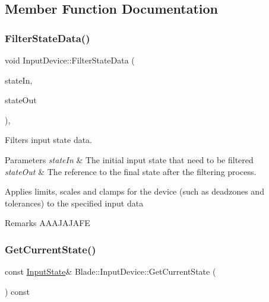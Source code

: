 \subsection{Member Function Documentation}
\mbox{\label{class_blade_1_1_input_device_ad9d8a25471322063e459f7b13f328d20}} 
\subsubsection{\texorpdfstring{Filter\+State\+Data()}{FilterStateData()}}
{\footnotesize\ttfamily void Input\+Device\+::\+Filter\+State\+Data (\begin{DoxyParamCaption}\item[{const \hyperlink{struct_blade_1_1_input_state}{Input\+State} \&}]{state\+In,  }\item[{\hyperlink{struct_blade_1_1_input_state}{Input\+State} \&}]{state\+Out }\end{DoxyParamCaption})\hspace{0.3cm}{\ttfamily [static]}, {\ttfamily [protected]}}



Filters input state data. 


\begin{DoxyParams}{Parameters}
{\em state\+In} & The initial input state that need to be filtered \\
\hline
{\em state\+Out} & The reference to the final state after the filtering process.\\
\hline
\end{DoxyParams}
Applies limits, scales and clamps for the device (such as deadzones and tolerances) to the specified input data \begin{DoxyRemark}{Remarks}
A\+A\+A\+J\+A\+J\+A\+FE 
\end{DoxyRemark}
\mbox{\label{class_blade_1_1_input_device_a71a14408ab206c4d983012b06b921d37}} 
\subsubsection{\texorpdfstring{Get\+Current\+State()}{GetCurrentState()}}
{\footnotesize\ttfamily const \hyperlink{struct_blade_1_1_input_state}{Input\+State}\& Blade\+::\+Input\+Device\+::\+Get\+Current\+State (\begin{DoxyParamCaption}{ }\end{DoxyParamCaption}) const\hspace{0.3cm}{\ttfamily [inline]}}



